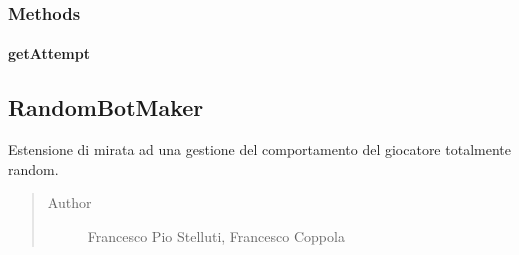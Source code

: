 \documentclass[letterpaper,10pt,italian]{sphinxmanual}
\begin{document}
\subsubsection{Methods}
\label{\detokenize{source/it/unicam/cs/pa/mastermind/players/RandomBotBreaker:methods}}

\paragraph{getAttempt}
\label{\detokenize{source/it/unicam/cs/pa/mastermind/players/RandomBotBreaker:getattempt}}

\begin{fulllineitems}
\label{\detokenize{source/it/unicam/cs/pa/mastermind/players/RandomBotBreaker:it.unicam.cs.pa.mastermind.players.RandomBotBreaker.getAttempt(InteractionView)}}
\end{fulllineitems}



\subsection{RandomBotMaker}
\label{\detokenize{source/it/unicam/cs/pa/mastermind/players/RandomBotMaker:randombotmaker}}\label{\detokenize{source/it/unicam/cs/pa/mastermind/players/RandomBotMaker::doc}}

\begin{fulllineitems}
\label{\detokenize{source/it/unicam/cs/pa/mastermind/players/RandomBotMaker:it.unicam.cs.pa.mastermind.players.RandomBotMaker}}
Estensione di  mirata ad una gestione del comportamento del giocatore totalmente random.
\begin{quote}\begin{description}
\item[{Author}] \leavevmode
Francesco Pio Stelluti, Francesco Coppola

\end{description}\end{quote}

\end{fulllineitems}
\end{document}
